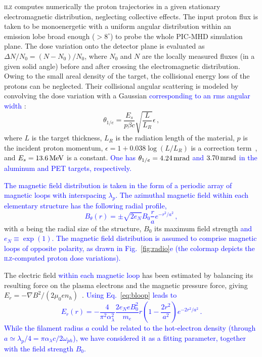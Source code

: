 \documentclass[aps,showpacs,superscriptaddress]{revtex4}
\begin{document}
\textsc{ilz} computes numerically the proton trajectories in a given stationary electromagnetic distribution, neglecting collective effects. 
The input proton flux is taken to be monoenergetic with a uniform angular distribution within an emission lobe broad enough  ($>8^\circ$) to probe the whole PIC-MHD simulation plane. The dose variation onto the detector plane is evaluated as $\Delta N/N_0= (N-N_0)/N_0$, where $N_0$ and $N$ are the locally measured fluxes (in a given solid angle) before and after crossing the electromagnetic distribution. Owing to the small areal density of the target, the collisional energy loss of the protons can be neglected. Their collisional angular scattering is modeled by convolving the dose variation with a Gaussian \textcolor{blue}{corresponding to an rms angular width} \cite{NIM_Highland_1975}:
\begin{equation}
\theta_{1/e}  = \frac{E_s}{p\beta c} \sqrt{\frac{L}{L_R}} \epsilon \,,
\end{equation}
where $L$ is the target thickness, $L_R$ is the radiation length of the material, $p$ is the incident proton momentum, $\epsilon = 1 + 0.038 \log\left(L/L_R\right)$ is a correction term~\cite{EPJ_Groom_2000}, and $E_s=13.6\,\rm MeV$ is a constant.
\textcolor{blue}{One has $\theta_{1/e}  = 4.24\,\rm mrad$ and $3.70\,\rm mrad$ in the aluminum and PET targets, respectively.}

\textcolor{blue}{The magnetic field distribution is taken in the form of a periodic array of magnetic loops with interspacing $\lambda_p$. The azimuthal magnetic field within each elementary structure has the following radial profile,
\begin{equation}\label{eq:bloop}
B_\theta(r) = \pm \sqrt{2 e_N} B_0 \frac{r}{a} e^{-r^2/a^2} \,,
\end{equation}}
with $a$ being the radial size of the structure, $B_0$ its maximum field strength \textcolor{blue}{and $e_N \equiv \exp(1)$. The magnetic field distribution is assumed to comprise magnetic loops of opposite polarity, as drawn in Fig.~\ref{fig:radio}e (the colormap depicts the \textsc{ilz}-computed proton dose variations).}

The electric field \textcolor{blue}{within each magnetic loop} has been estimated by balancing its resulting force on the plasma electrons and the magnetic pressure force, giving $E_r = -\nabla B^2 /(2\mu_0e n_h)$~\cite{POP_Dieckmann_2009, POP_Bret_Gremillet_2010}. 
\textcolor{blue}{Using Eq.~\eqref{eq:bloop} leads to
\begin{equation}\label{eq:eloop}
E_r(r) = -
\frac{4}{\pi^2\alpha_\lambda^2}
\frac{2e_N e B_0^2}{m_e} r\left( 1-\frac{2r^2}{a^2}\right) e^{-2r^2/a^2} \,.
\end{equation}
While the filament radius $a$ could be related to the hot-electron density (through $a \simeq \lambda_p/4=\pi \alpha_\lambda c/2\omega_{ph}$), we have considered it as a fitting parameter, together with the field strength $B_0$.}
\end{document}
